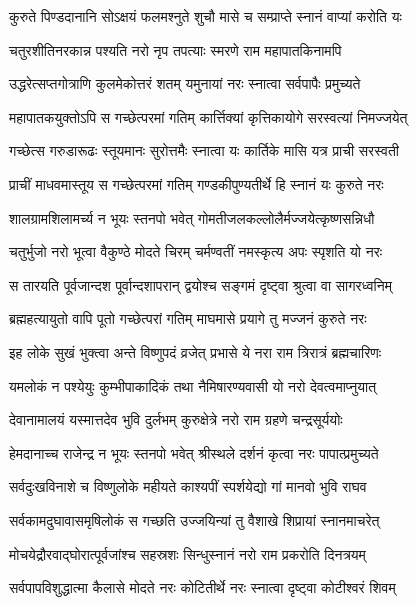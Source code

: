 \twolineshloka
{कुरुते पिण्डदानानि सोऽक्षयं फलमश्नुते}
{शुचौ मासे च सम्प्राप्ते स्नानं वाप्यां करोति यः}%

\twolineshloka
{चतुरशीतिनरकान्न पश्यति नरो नृप}
{तपत्याः स्मरणे राम महापातकिनामपि}%

\twolineshloka
{उद्धरेत्सप्तगोत्राणि कुलमेकोत्तरं शतम्}
{यमुनायां नरः स्नात्वा सर्वपापैः प्रमुच्यते}%

\twolineshloka
{महापातकयुक्तोऽपि स गच्छेत्परमां गतिम्}
{कार्त्तिक्यां कृत्तिकायोगे सरस्वत्यां निमज्जयेत्}%

\twolineshloka
{गच्छेत्स गरुडारूढः स्तूयमानः सुरोत्तमैः}
{स्नात्वा यः कार्तिके मासि यत्र प्राची सरस्वती}%

\twolineshloka
{प्राचीं माधवमास्तूय स गच्छेत्परमां गतिम्}
{गण्डकीपुण्यतीर्थे हि स्नानं यः कुरुते नरः}%

\twolineshloka
{शालग्रामशिलामर्च्य न भूयः स्तनपो भवेत्}
{गोमतीजलकल्लोलैर्मज्जयेत्कृष्णसन्निधौ}%

\twolineshloka
{चतुर्भुजो नरो भूत्वा वैकुण्ठे मोदते चिरम्}
{चर्मण्वतीं नमस्कृत्य अपः स्पृशति यो नरः}%

\twolineshloka
{स तारयति पूर्वजान्दश पूर्वान्दशापरान्}
{द्वयोश्च सङ्गमं दृष्ट्वा श्रुत्वा वा सागरध्वनिम्}%

\twolineshloka
{ब्रह्महत्यायुतो वापि पूतो गच्छेत्परां गतिम्}
{माघमासे प्रयागे तु मज्जनं कुरुते नरः}%

\twolineshloka
{इह लोके सुखं भुक्त्वा अन्ते विष्णुपदं व्रजेत्}
{प्रभासे ये नरा राम त्रिरात्रं ब्रह्मचारिणः}%

\twolineshloka
{यमलोकं न पश्येयुः कुम्भीपाकादिकं तथा}
{नैमिषारण्यवासी यो नरो देवत्वमाप्नुयात्}%

\twolineshloka
{देवानामालयं यस्मात्तदेव भुवि दुर्लभम्}
{कुरुक्षेत्रे नरो राम ग्रहणे चन्द्रसूर्ययोः}%

\twolineshloka
{हेमदानाच्च राजेन्द्र न भूयः स्तनपो भवेत्}
{श्रीस्थले दर्शनं कृत्वा नरः पापात्प्रमुच्यते}%

\twolineshloka
{सर्वदुःखविनाशे च विष्णुलोके महीयते}
{काश्यपीं स्पर्शयेद्यो गां मानवो भुवि राघव}%

\twolineshloka
{सर्वकामदुघावासमृषिलोकं स गच्छति}
{उज्जयिन्यां तु वैशाखे शिप्रायां स्नानमाचरेत्}%

\twolineshloka
{मोचयेद्रौरवाद्घोरात्पूर्वजांश्च सहस्रशः}
{सिन्धुस्नानं नरो राम प्रकरोति दिनत्रयम्}%

\twolineshloka
{सर्वपापविशुद्धात्मा कैलासे मोदते नरः}
{कोटितीर्थे नरः स्नात्वा दृष्ट्वा कोटीश्वरं शिवम्}%

